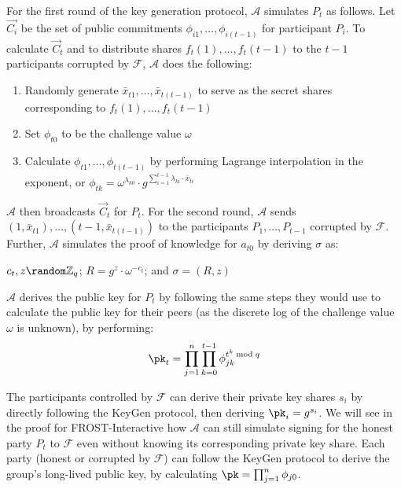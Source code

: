 For the first round of the key generation protocol, $\mathcal{A}$ simulates
$P_t$ as follows. Let $\Vec{C_i}$ be the
set of public commitments $\phi_{i1}, \dots, \phi_{i(t-1)}$ for participant
$P_i$. To calculate $\Vec{C}_t$ and to distribute shares $f_t(1), \dots,
f_t(t-1)$ to the $t-1$ participants corrupted by $\mathcal{F}$, $\mathcal{A}$
does the following:

\begin{enumerate}
    \item Randomly generate $\bar{x}_{t1}, \dots, \bar{x}_{t(t-1)}$ to
      serve as the secret shares corresponding to $f_t(1), \dots, f_t(t-1)$
    \item  Set $\phi_{t0}$ to be the challenge value $\omega$
    \item Calculate $\phi_{t1}, \dots, \phi_{t(t-1)}$  by performing
      Lagrange interpolation in the exponent, or $\phi_{tk} =
      \omega^{\lambda_{k0} } \cdot g^{ \sum_{i=1}^{t-1} \lambda_{ki} \cdot \bar{x}_{ti}}$
\end{enumerate}

$\mathcal{A}$ then broadcasts $\Vec{C}_t$ for $P_t$.
For the second round, $\mathcal{A}$ sends $(1, \bar{x}_{t1}), \dots, (t-1,
\bar{x}_{t(t-1)})$ to the participants $P_1, \dots, P_{t-1}$ corrupted by
$\mathcal{F}$. Further, $\mathcal{A}$  simulates the proof of knowledge for
$a_{t0}$ by deriving $\sigma$ as:

\begin{center}
    $c_t, z \random \mathbb{Z}_q$;
    $R = g^z \cdot \omega^{-c_t}$; and
    $\sigma = (R, z)$
\end{center}

$\mathcal{A}$ derives the public key for $P_t$ by
following the same steps they would use to calculate the public key for their
peers (as the discrete log of the challenge value $\omega$ is unknown),
by performing:
\[
    \pk_t = \prod_{j=1}^n \prod_{k=0}^{t-1} \phi_{jk}^{t^k \bmod q}
\]


The participants controlled by $\mathcal{F}$ can derive their private key
shares $s_i$ by directly following the KeyGen protocol, then deriving $\pk_i =
g^{s_i}$.
We will see in the proof for FROST-Interactive how
$\mathcal{A}$ can still simulate signing for the honest party $P_t$ to $\mathcal{F}$
even without knowing its corresponding private key share.
Each party (honest or corrupted by $\mathcal{F}$) can follow the KeyGen
protocol to derive the group's long-lived public key, by calculating $\pk =
\prod_{j=1}^n \phi_{j0}$.

